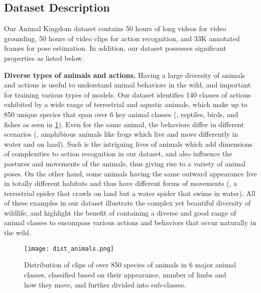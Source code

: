 \documentclass[10pt,twocolumn,letterpaper]{article}
\begin{document}
    \subsection{Dataset Description}
    Our Animal Kingdom dataset contains 50 hours of long videos for video grounding, 50 hours of video clips for action recognition, and 33K annotated frames for pose estimation. In addition, our dataset possesses significant properties as listed below.
    
    
    
    \textbf{Diverse types of animals and actions.}
    Having a large diversity of animals and actions is useful to understand animal behaviors in the wild, and important for training various types of models. Our dataset identifies 140 classes of actions exhibited by a wide range of terrestrial and aquatic animals, which make up to 850 unique species that span over 6 key animal classes (\eg, reptiles, birds, and fishes as seen in \cref{fig:dist_animal}). Even for the same animal, the behaviors differ in different scenarios (\eg, amphibious animals like frogs which live and move differently in water and on land). Such is the intriguing lives of animals which add dimensions of complexities to action recognition in our dataset, and also influence the postures and movements of the animals, thus giving rise to a variety of animal poses. On the other hand, some animals having the same outward appearance live in totally different habitats and thus have different forms of movements (\eg, a terrestrial spider that crawls on land but a water spider that swims in water). All of these examples in our dataset illustrate the complex yet beautiful diversity of wildlife, and highlight the benefit of containing a diverse and good range of animal classes to encompass various actions and behaviors that occur naturally in the wild. 
    
    
    
    \begin{figure}[t]
    
        \centering
    
        \texttt{[image: dist\_animals.png]}
        \vspace{-0.6cm}
        \caption{Distribution of clips of over 850 species of animals in 6 major animal classes, classified based on their appearance, number of limbs and how they move, and further divided into sub-classes.}
        \label{fig:dist_animal}
        \vspace{-0.3cm}
    \end{figure}
    
\end{document}
